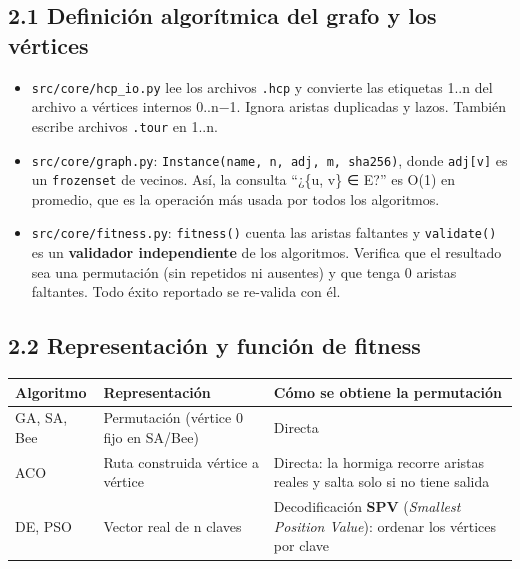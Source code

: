 \documentclass[
  spanish,
  12pt,
]{article}
\newcounter{none} %
\providecommand{\tightlist}{%
  \setlength{\itemsep}{0pt}\setlength{\parskip}{0pt}}
\begin{document}
\subsection{2.1 Definición algorítmica del grafo y los
vértices}\label{definiciuxf3n-algoruxedtmica-del-grafo-y-los-vuxe9rtices}

\begin{itemize}
\tightlist
\item
  \texttt{src/core/hcp\_io.py} lee los archivos \texttt{.hcp} y
  convierte las etiquetas 1..n del archivo a vértices internos 0..n−1.
  Ignora aristas duplicadas y lazos. También escribe archivos
  \texttt{.tour} en 1..n.
\item
  \texttt{src/core/graph.py}:
  \texttt{Instance(name,\ n,\ adj,\ m,\ sha256)}, donde
  \texttt{adj{[}v{]}} es un \texttt{frozenset} de vecinos. Así, la
  consulta ``¿\{u, v\} ∈ E?'' es O(1) en promedio, que es la operación
  más usada por todos los algoritmos.
\item
  \texttt{src/core/fitness.py}: \texttt{fitness()} cuenta las aristas
  faltantes y \texttt{validate()} es un \textbf{validador independiente}
  de los algoritmos. Verifica que el resultado sea una permutación (sin
  repetidos ni ausentes) y que tenga 0 aristas faltantes. Todo éxito
  reportado se re-valida con él.
\end{itemize}

\subsection{2.2 Representación y función de
fitness}\label{representaciuxf3n-y-funciuxf3n-de-fitness}

{\def\LTcaptype{none} %
\begin{longtable}[]{@{}
  >{\raggedright\arraybackslash}p{}
  >{\raggedright\arraybackslash}p{}
  >{\raggedright\arraybackslash}p{}@{}}
\toprule\noalign{}
\begin{minipage}[b]{\linewidth}\raggedright
Algoritmo
\end{minipage} & \begin{minipage}[b]{\linewidth}\raggedright
Representación
\end{minipage} & \begin{minipage}[b]{\linewidth}\raggedright
Cómo se obtiene la permutación
\end{minipage} \\
\midrule\noalign{}
\endhead
\bottomrule\noalign{}
\endlastfoot
GA, SA, Bee & Permutación (vértice 0 fijo en SA/Bee) & Directa \\
ACO & Ruta construida vértice a vértice & Directa: la hormiga recorre
aristas reales y salta solo si no tiene salida \\
DE, PSO & Vector real de n claves & Decodificación \textbf{SPV}
(\emph{Smallest Position Value}): ordenar los vértices por clave \\
\end{longtable}
}
\end{document}
